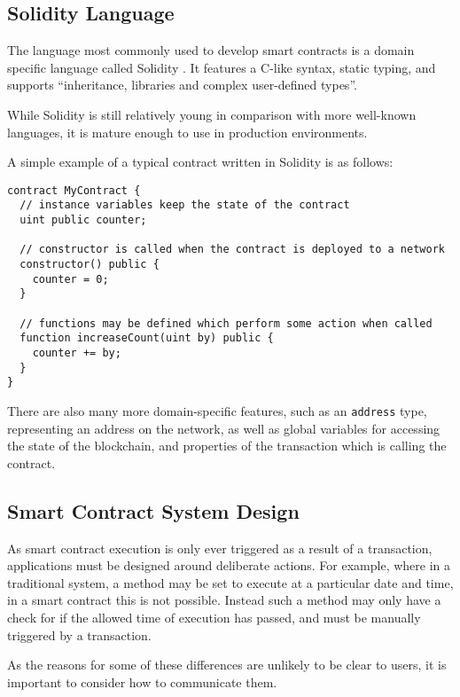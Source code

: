 \subsection{Solidity Language}

The language most commonly used to develop smart contracts is a domain specific language called Solidity \cite{Solidity}. It features a C-like syntax, static typing, and supports \enquote{inheritance, libraries and complex user-defined types}.

While Solidity is still relatively young in comparison with more well-known languages, it is mature enough to use in production environments.

A simple example of a typical contract written in Solidity is as follows:

\begin{lstlisting}[language=Solidity]
contract MyContract {
  // instance variables keep the state of the contract
  uint public counter;

  // constructor is called when the contract is deployed to a network
  constructor() public {
    counter = 0;
  }

  // functions may be defined which perform some action when called
  function increaseCount(uint by) public {
    counter += by;
  }
}
\end{lstlisting}

There are also many more domain-specific features, such as an \lstinline{address} type, representing an address on the network, as well as global variables for accessing the state of the blockchain, and properties of the transaction which is calling the contract.

\subsection{Smart Contract System Design}

As smart contract execution is only ever triggered as a result of a transaction, applications must be designed around deliberate actions. For example, where in a traditional system, a method may be set to execute at a particular date and time, in a smart contract this is not possible. Instead such a method may only have a check for if the allowed time of execution has passed, and must be manually triggered by a transaction.

As the reasons for some of these differences are unlikely to be clear to users, it is important to consider how to communicate them.

